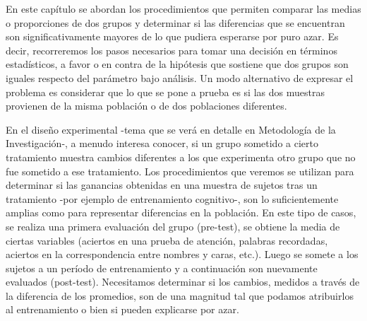 \documentclass[]{book}
\begin{document}
En este capítulo se abordan los procedimientos que permiten comparar las
medias o proporciones de dos grupos y determinar si las diferencias que
se encuentran son significativamente mayores de lo que pudiera esperarse
por puro azar. Es decir, recorreremos los pasos necesarios para tomar
una decisión en términos estadísticos, a favor o en contra de la
hipótesis que sostiene que dos grupos son iguales respecto del parámetro
bajo análisis. Un modo alternativo de expresar el problema es considerar
que lo que se pone a prueba es si las dos muestras provienen de la misma
población o de dos poblaciones diferentes.

En el diseño experimental -tema que se verá en detalle en Metodología de
la Investigación-, a menudo interesa conocer, si un grupo sometido a
cierto tratamiento muestra cambios diferentes a los que experimenta otro
grupo que no fue sometido a ese tratamiento. Los procedimientos que
veremos se utilizan para determinar si las ganancias obtenidas en una
muestra de sujetos tras un tratamiento -por ejemplo de entrenamiento
cognitivo-, son lo suficientemente amplias como para representar
diferencias en la población. En este tipo de casos, se realiza una
primera evaluación del grupo (pre-test), se obtiene la media de ciertas
variables (aciertos en una prueba de atención, palabras recordadas,
aciertos en la correspondencia entre nombres y caras, etc.). Luego se
somete a los sujetos a un período de entrenamiento y a continuación son
nuevamente evaluados (post-test). Necesitamos determinar si los cambios,
medidos a través de la diferencia de los promedios, son de una magnitud
tal que podamos atribuirlos al entrenamiento o bien si pueden explicarse
por azar.
\end{document}
